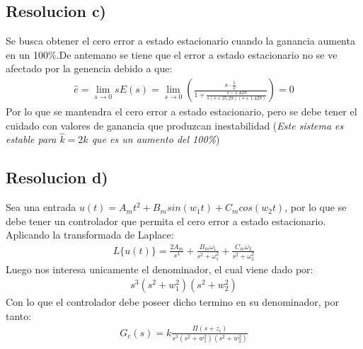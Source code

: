 \documentclass[
  11pt,
  letterpaper,
   addpoints,
  ]{exam}
\begin{document}
\begin{questions}
\begin{solution}
\subsection*{Resolucion c)}
Se busca obtener el cero error a estado estacionario cuando la ganancia aumenta en un 100\%.De antemano se tiene que el error a estado estacionario no se ve afectado por la genencia debido a que:
\begin{align}
    \hat{e}= \lim_{s \to 0} sE(s) = \lim_{s \to 0} \left(\frac{s \cdot \frac{1}{s}}{1+ \frac{s-1.429}{s(s+25.29)(s+1.429)}}\right) = 0
\end{align}
Por lo que se mantendra el cero error a estado estacionario, pero se debe tener el cuidado con valores de ganancia que produzcan inestabilidad (\textit{Este sistema es estable para $\hat{k} = 2k$ que es un aumento del 100\%})
\subsection*{Resolucion d)}
Sea una entrada $u(t)= A_m t^{2} + B_m sin(w_{1}t) + C_m cos(w_{2}t)$, por lo que se debe tener un controlador que permita el cero error a estado estacionario. Aplicando la transformada de Laplace:
\begin{align}
    L\{u(t)\} = \frac{2A_m}{s^{3}} + \frac{B_m \omega_{1}}{s^{2} + \omega_{1}^{2}} + \frac{C_m \omega_{2}}{s^{2} + \omega_{2}^{2}}
\end{align}
Luego nos interesa unicamente el denominador, el cual viene dado por:
\begin{align}
    s^{3}(s^{2}+w_{1}^{2})(s^{2} + w_{2}^{2})
\end{align}
Con lo que el controlador debe poseer dicho termino en su denominador, por tanto:
\begin{align}
    G_{c}(s) = k \frac{\Pi (s+ z_{i}) }{ s^{3}(s^{2}+w_{1}^{2})(s^{2} + w_{2}^{2})}
\end{align}


\end{solution}
\end{questions}
\end{document}
